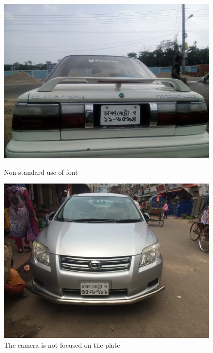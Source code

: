 \documentclass{standalone}
\begin{document}
\begin{figure}
\centering
\begin{minipage}{.45\textwidth}
    \centering
    \includegraphics[width=0.9\linewidth]{./img/experiment/stage.1/badfont}
    \caption{Non-standard use of font}
\end{minipage}
\begin{minipage}{.45\textwidth}
    \centering
    \includegraphics[width=0.9\linewidth]{./img/experiment/stage.1/good}
    \caption{The camera is not focused on the plate}
\end{minipage}
\end{figure}
\end{document}

